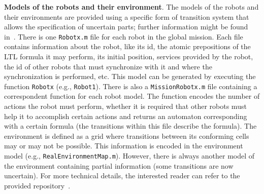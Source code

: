 \textbf{Models of the robots and their environment}. 
The models of the robots and their environments are provided using a specific form of transition system that allows the specification of uncertain parts; further information might be found in~\cite{menghi2018multi}.
There is one \texttt{Robotx.m} file for each robot in the global mission.
Each file contains information about the robot, like its id, the atomic prepositions of the LTL formula it may perform, its initial position, services provided by the robot, the id of other robots that must synchronize with it and where the synchronization is performed, etc.
This model can be generated by executing the function \texttt{Robotx} (e.g., \texttt{Robot1}).
There is also a \texttt{MissionRobotx.m} file containing a correspondent function for each robot model.
The function encodes the number of actions the robot must perform, whether it is required that other robots must help it to accomplish certain actions and returns an automaton corresponding with a certain formula (the transitions within this file describe the formula).
The environment is defined as a grid where transitions between its conforming cells may or may not be possible.
This information is encoded in the environment model (e.g., \texttt{RealEnvironmentMap.m}).
However, there is always another model of the environment containing partial information (some transitions are now uncertain).
For more technical details, the interested reader can refer to the provided repository~\cite{repo}.


